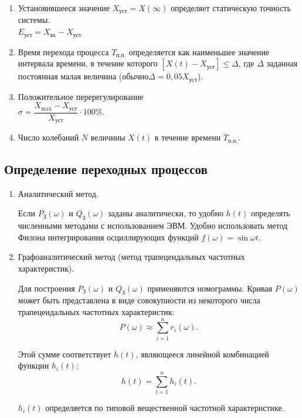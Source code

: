 \documentclass[unicode, 12pt, a4paper, oneside]{article}
\begin{document}
\begin{enumerate}
\item Установившееся значение $ X_\text{уст} = X(\infty) $ определяет статическую точность системы.\\ $ E_\text{уст} = X_\text{вх} - X_\text{уст} $
\item Время перехода процесса $ T_\text{п.п.} $ определяется как наименьшее значение интервала времени, в течение которого $ [X(t)- X_\text{уст}] \leq \Delta $, где $ \Delta $ заданная постоянная малая величина (обычно$  \Delta = 0,05 X_\text{уст} $).
\item Положительное перерегулирование\\ $ \sigma = \dfrac{X_\text{max} - X_\text{уст}}{X_\text{уст}} \cdot 100\% $.
\item Число колебаний $ N $ величины $ X(t) $ в течение времени $ T_\text{п.п.} $.
\end{enumerate}

\subsection*{Определение переходных процессов}

\begin{enumerate}
\item Аналитический метод.

Если $ P_\text{З}(\omega) $ и $ Q_\text{З}(\omega) $ заданы аналитически, то удобно $ h(t) $ определять численными методами с использованием ЭВМ. Удобно использовать метод Филона интегрирования осциллирующих функций $ f(\omega) = \sin\omega t $.


\item Графоаналитический метод (метод трапецеидальных частотных характеристик).

Для построения $ P_\text{З}(\omega) $ и $ Q_\text{З}(\omega) $ применяются номограммы. Кривая $ P(\omega) $ может быть представлена в виде совокупности из некоторого числа трапецеидальных частотных характеристик:
\begin{equation}
P(\omega) \approx \sum_{i=1}^{n} r_i(\omega).
\end{equation}

Этой сумме соответствует $ h(t) $, являющееся линейной комбинацией функции $ h_i(t) $:
\begin{equation}
h(t) = \sum_{i=1}^{n} h_i(t).
\end{equation}

$ h_i(t) $ определяется по типовой вещественной частотной характеристике.
\end{enumerate}
\end{document}
